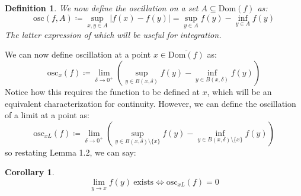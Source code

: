 \documentclass[10pt,letterpaper]{article} %
\newtheorem{defn}{Definition}[section]
\newtheorem{cor}{Corollary}[section]
\begin{document}
\begin{defn}
We now define the oscillation on a set $A \subseteq \text{Dom}(f)$ as:
\begin{equation*}
\text{osc}(f, A) \coloneq \sup_{x, y \in A}|f(x) - f(y)| = \sup_{y \in A}f(y) - \inf_{y \in A}f(y)
\end{equation*}
The latter expression of which will be useful for integration.
\end{defn}
We can now define oscillation at a point $x \in \overline{\text{Dom}(f)}$ as:
\begin{equation*}
\text{osc}_x(f) \coloneq \lim_{\delta \xrightarrow{} 0^+}(\sup_{y \in B(x, \delta)}f(y) - \inf_{y \in B(x, \delta)}f(y))
\end{equation*}
Notice how this requires the function to be defined at $x$, which will be an equivalent characterization for continuity. However, we can define the oscillation of a limit at a point as:
\begin{equation*}
\text{osc}_{xL}(f) \coloneq \lim_{\delta \xrightarrow{} 0^+}(\sup_{y \in B(x, \delta)\setminus \{x\}}f(y) - \inf_{y \in B(x, \delta)\setminus \{x\}}f(y))
\end{equation*}
so restating Lemma 1.2, we can say:
\begin{cor}
\begin{equation*}
\lim_{y \xrightarrow{} x}f(y) \ \text{exists} \iff \text{osc}_{xL}(f) = 0
\end{equation*}
\end{cor}
\end{document}
